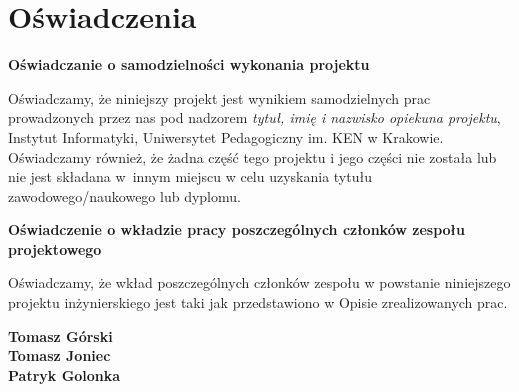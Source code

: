 \documentclass[12pt,a4paper,oneside]{article}
\theoremstyle{definition}
\numberwithin{equation}{section}
\begin{document}
\section{Oświadczenia}
\begin{center}
\textbf{Oświadczanie o samodzielności wykonania projektu}
\end{center}

Oświadczamy, że niniejszy projekt jest wynikiem samodzielnych prac prowadzonych przez nas pod nadzorem \textit{tytuł, imię i nazwisko opiekuna projektu}, Instytut Informatyki, Uniwersytet Pedagogiczny im. KEN w Krakowie. Oświadczamy również, że żadna część tego projektu i jego części nie została lub nie jest składana w~innym miejscu w celu uzyskania tytułu zawodowego/naukowego lub dyplomu.


\begin{center}
\textbf{Oświadczenie o wkładzie pracy poszczególnych członków zespołu projektowego} 
\end{center}

Oświadczamy, że wkład poszczególnych członków zespołu  w powstanie niniejszego projektu inżynierskiego jest taki jak przedstawiono w Opisie zrealizowanych prac. 

\vspace*{20pt}
\noindent
\textbf{Tomasz Górski} \\
\textbf{Tomasz Joniec} \\
\textbf{Patryk Golonka}\\
\vspace*{20pt}

\pagebreak





\renewcommand\refname{Literatura (jeżeli wymagana)}

%
%
%
\end{document}
